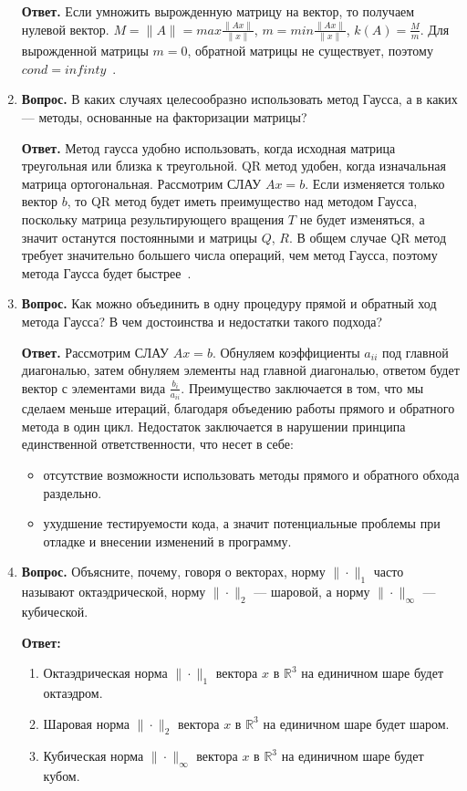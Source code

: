 \documentclass[12pt, a4paper]{article}
\begin{document}
\begin{enumerate}
	\textbf{Ответ.} Если умножить вырожденную матрицу на вектор, то получаем нулевой вектор. $M = \|A\| = max \frac{\|Ax\|}{\|x\|}$, $m = min \frac{\|Ax\|}{\|x\|}$, $k(A) = \frac{M}{m}$. Для вырожденной матрицы $m = 0$, обратной матрицы не существует, поэтому $cond = infinty$~\cite{conditionNum}.
	\item  \textbf{Вопрос.} В каких случаях целесообразно использовать метод Гаусса,
	а в каких — методы, основанные на факторизации матрицы?
	
	\textbf{Ответ.} Метод гаусса удобно использовать, когда исходная матрица треугольная или близка к треугольной. QR метод удобен, когда изначальная матрица ортогональная. Рассмотрим СЛАУ $Ax = b$. Если изменяется только вектор $b$, то QR метод будет иметь преимущество над методом Гаусса, поскольку матрица результирующего вращения $T$ не будет изменяться, а значит останутся постоянными и матрицы $Q$, $R$.
	В общем случае QR метод требует значительно большего числа операций, чем метод Гаусса, поэтому метода Гаусса будет быстрее~\cite{MetVich}.
	\item \textbf{Вопрос.} Как можно объединить в одну процедуру прямой и обратный ход метода Гаусса? В чем достоинства и недостатки
	такого подхода?
	
	\textbf{Ответ.} Рассмотрим СЛАУ $Ax = b$. Обнуляем коэффициенты $a_{ii}$ под главной диагональю, затем обнуляем элементы над главной диагональю, ответом будет вектор с элементами вида $\frac {b_i}{a_{ii}}$. Преимущество заключается в том, что мы сделаем меньше итераций, благодаря объедению работы прямого и обратного метода в один цикл. Недостаток заключается в нарушении принципа единственной ответственности, что несет в себе: 
	\begin{itemize}
		\item отсутствие возможности использовать методы прямого и обратного обхода раздельно.
		\item ухудшение тестируемости кода, а значит потенциальные проблемы при отладке и внесении изменений в программу.
	\end{itemize}
	\item \textbf{Вопрос.} Объясните, почему, говоря о векторах, норму $\|\cdot\|_1$ часто
	называют октаэдрической, норму $\|\cdot\|_2$ — шаровой, а норму $\|\cdot\|_\infty$
	— кубической.
	
	\textbf{Ответ:}
		\begin{enumerate}
		\item Октаэдрическая норма $\|\cdot\|_1$ вектора $x$ в $\mathbb{R}^3$ на единичном шаре будет октаэдром.
		\item Шаровая норма $\|\cdot\|_2$ вектора $x$ в $\mathbb{R}^3$ на единичном шаре будет шаром.
		\item Кубическая норма $\|\cdot\|_\infty$ вектора $x$ в $\mathbb{R}^3$ на единичном шаре будет кубом.
		\end{enumerate}
\end{enumerate}
\end{document}
